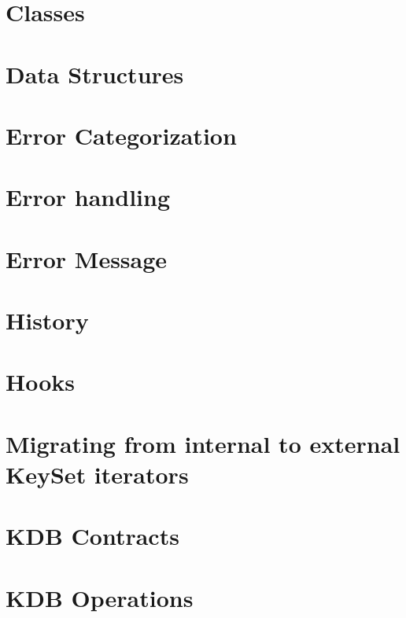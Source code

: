 \let\mypdfximage\pdfximage\def\pdfximage{\immediate\mypdfximage}\documentclass[twoside]{book}
\newcommand{\+}{\discretionary{\mbox{\scriptsize$\hookleftarrow$}}{}{}}
\begin{document}
\chapter{Classes}
\label{doc_dev_classes_md}

\chapter{Data Structures}
\label{doc_dev_data-structures_md}

\chapter{Error Categorization}
\label{doc_dev_error-categorization_md}

\chapter{Error handling}
\label{doc_dev_error-handling_md}

\chapter{Error Message}
\label{doc_dev_error-message_md}

\chapter{History}
\label{doc_dev_history_md}

\chapter{Hooks}
\label{doc_dev_hooks_md}

\chapter{Migrating from internal to external Key\+Set iterators}
\label{doc_dev_iterators_md}

\chapter{KDB Contracts}
\label{doc_dev_kdb-contracts_md}

\chapter{KDB Operations}
\label{doc_dev_kdb-operations_md}

\end{document}
